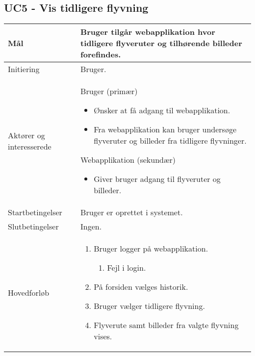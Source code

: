 \subsection*{UC5 - Vis tidligere flyvning}

\begin{table}[H]
\begin{tabular}{| p{3cm}| p{11.5cm}|}
\hline

Mål	 								& Bruger tilgår webapplikation hvor tidligere flyveruter og tilhørende billeder forefindes. \\\hline
Initiering 							& Bruger. \\\hline
Aktører og \newline interesserede			& Bruger (primær) 
										\begin{itemize}
											\item Ønsker at få adgang til webapplikation. 
											\item Fra webapplikation kan bruger undersøge flyveruter og billeder fra tidligere flyvninger.
										\end{itemize} 
									  Webapplikation (sekundær)
										\begin{itemize}
											\item Giver bruger adgang til flyveruter og billeder.
										\end{itemize} \\\hline
Startbetingelser							& Bruger er oprettet i systemet. \\\hline
Slutbetingelser						& Ingen. \\\hline
Hovedforløb				&
 
									\renewcommand{\labelenumi}{\arabic{enumi}.}
									\renewcommand{\labelenumii}{\Roman{enumii}:}

									\begin{enumerate}[topsep=0.0cm, leftmargin=0.5cm]
										\item Bruger logger på webapplikation.
										\begin{enumerate}[partopsep=4cm, topsep=0cm, leftmargin=1cm]
												\item Fejl i login.
										\end{enumerate}
										\item På forsiden vælges historik.
										\item Bruger vælger tidligere flyvning.	
										\item Flyverute samt billeder fra valgte flyvning vises.
									\end{enumerate} \\\hline	


\end{tabular}
\end{table}
